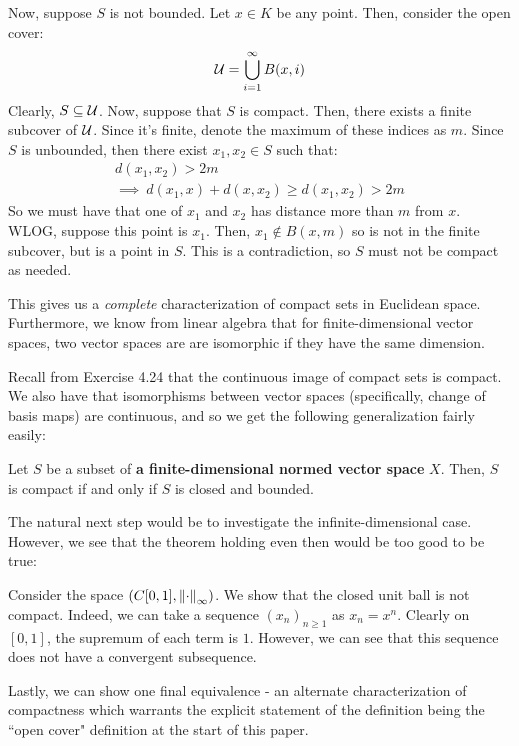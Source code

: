 \begin{pf}
    Now, suppose $ S $ is not bounded. Let $ x \in K $ be any point. Then, consider the open cover:
    \begin{equation*}
        \mathcal{U} = \bigcup_{i = 1}^{\infty} B(x, i)
    \end{equation*}
    Clearly, $ S \subseteq \mathcal{U} $.
    Now, suppose that $ S $ is compact. Then, there exists a finite subcover of $ \mathcal{U} $.
    Since it's finite, denote the maximum of these indices as $ m $. \vsp
    Since $ S $ is unbounded, then there exist $ x_{1}, x_{2} \in S $ such that:
    \begin{gather*}
        d(x_{1}, x_{2}) > 2m \\
        \implies \ d(x_{1}, x) + d(x, x_{2}) \geq d(x_{1}, x_{2}) > 2m
    \end{gather*}
    So we must have that one of $ x_{1} $ and $ x_{2} $ has distance more than $ m $ from $ x $.
    WLOG, suppose this point is $ x_{1} $.
    Then, $ x_{1} \notin B(x, m) $ so is not in the finite subcover, but is a point in $ S $.
    This is a contradiction, so $ S $ must not be compact as needed.
\end{pf}

This gives us a \textit{complete} characterization of compact sets in Euclidean space. Furthermore,
we know from linear algebra that for finite-dimensional vector spaces, two vector spaces are
are isomorphic if they have the same dimension.

Recall from Exercise 4.24 that the continuous image of compact sets is compact. We also have that
isomorphisms between vector spaces (specifically, change of basis maps) are continuous, and so
we get the following generalization fairly easily:

\begin{thm}[title=Generalized Heine-Borel Theorem]
    Let $ S $ be a subset of \textbf{a finite-dimensional normed vector space} $ X $.
    Then, $ S $ is compact if and only if $ S $ is closed and bounded.
\end{thm}

The natural next step would be to investigate the infinite-dimensional case. However, we see that
the theorem holding even then would be too good to be true:

\begin{xmp}
    Consider the space $ (C[0,1], \left\|\cdot\right\|_{\infty}) $.
    We show that the closed unit ball is not compact. \vsp
    Indeed, we can take a sequence $ (x_{n})_{n\geq1} $ as $ x_{n} = x^{n} $.
    Clearly on $ [0, 1] $, the supremum of each term is $ 1 $.
    However, we can see that this sequence does not have a convergent subsequence.
\end{xmp}
\vspace{-0.2in}
Lastly, we can show one final equivalence - an alternate characterization of compactness which
warrants the explicit statement of the definition being the ``open cover" definition at the start
of this paper.

